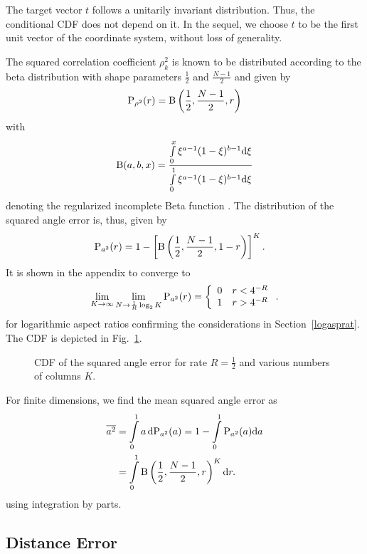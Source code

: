 \documentclass[twocolumn]{IEEEtran}
\begin{document}
The target vector $t$ follows a unitarily invariant distribution. Thus, the conditional CDF does not depend on it. In the sequel, we choose $t$ to be the first unit vector of the coordinate system, without loss of generality.

The squared correlation coefficient $\rho_k^2$ is known to be distributed according to the beta distribution with shape parameters $\frac12$ and $\frac {N-1}2$ \cite[Sec. III.A]{mueller:20a} and given by
\begin{equation}
{\text P}_{\rho^2}(r) = {\text B} \left(\frac12,\frac{N-1}2,r\right)
\end{equation}
with 
\begin{equation}
{\text B} (a,b,x) =  \frac{\int\limits_{0}^x \xi^{a-1} (1-\xi)^{b-1} {\text d}\xi}  {\int\limits_{0}^1 \xi^{a-1} (1-\xi)^{b-1} {\text d}\xi}
\end{equation}
denoting the regularized incomplete Beta function \cite{spanier:87}.
The distribution of the squared angle error is, thus, given by
\begin{align}
{\text P}_{a^2}(r) &= 1-\left[{\text B} \left(\frac12,\frac{N-1}2,1-r\right)\right]^K.
\end{align}
It is shown in the appendix to converge to
\begin{equation}
\lim\limits_{K\to\infty} \lim\limits_{N\to\frac1R\log_2 K} {\text P}_{a^2}(r) = \left\{
\begin{array}{ll}
0 & r < 4^{-R}\\
1 & r > 4^{-R}
\end{array}
\right..
\label{asymptoticdis}
\end{equation}
for logarithmic aspect ratios confirming the considerations in Section~\ref{logasprat}.
The CDF is depicted in Fig.~\ref{fig_cdf}.
\begin{figure}
\centerline{}
\caption{CDF of the squared angle error for rate $R=\frac 12$ and various numbers of columns $K$.
\label{fig_cdf}}
\end{figure}
For finite dimensions, we find the mean squared angle error as
\begin{align}
\overline{a^2} &= \int\limits_0^1 a\, \text{dP}_{a^2}(a) = 1- \int\limits_0^1 \text{P}_{a^2}(a) {\text d} a\\
& =  \int\limits_0^1 {\text B} \left(\frac12,\frac{N-1}2,r\right)^K {\text d}r.
\end{align}
using integration by parts.

\subsection{Distance Error}
\label{diserr}
\end{document}
